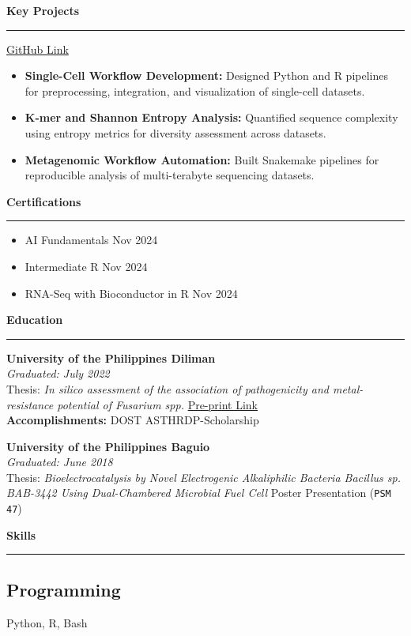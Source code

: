 \documentclass[a4paper,10pt]{article}
\newcommand{\sectiontitle}[1]{\vspace{10pt}\textbf{\Large #1}\vspace{5pt}\hrule\vspace{10pt}}
\begin{document}
	\sectiontitle{Key Projects} \dotfill \href{https://github.com/GABallena}{GitHub Link}
	\begin{itemize}[left=0pt]
		\item \textbf{Single-Cell Workflow Development:} Designed Python and R pipelines for preprocessing, integration, and visualization of single-cell datasets.
		\item \textbf{K-mer and Shannon Entropy Analysis:} Quantified sequence complexity using entropy metrics for diversity assessment across datasets.
		\item \textbf{Metagenomic Workflow Automation:} Built Snakemake pipelines for reproducible analysis of multi-terabyte sequencing datasets.
	\end{itemize}
	
	\sectiontitle{Certifications}
	\begin{itemize}[left=0pt]
		\item AI Fundamentals \dotfill Nov 2024
		\item Intermediate R \dotfill Nov 2024
		\item RNA-Seq with Bioconductor in R \dotfill Nov 2024
	\end{itemize}
	
	\sectiontitle{Education}
	
	\textbf{University of the Philippines Diliman} \\
	\textit{Graduated: July 2022} \\
	Thesis: \textit{In silico assessment of the association of pathogenicity and metal-resistance potential of \textit{Fusarium} spp.} \dotfill \href{https://www.biorxiv.org/content/10.1101/2022.10.12.511937v1}{Pre-print Link} \\
	\textbf{Accomplishments:} DOST ASTHRDP-Scholarship
	
	\textbf{University of the Philippines Baguio} \\
	\textit{Graduated: June 2018} \\
	Thesis: \textit{Bioelectrocatalysis by Novel Electrogenic Alkaliphilic Bacteria \textit{Bacillus} sp. BAB-3442 Using Dual-Chambered Microbial Fuel Cell} \dotfill Poster Presentation (\texttt{PSM 47})
	
	\sectiontitle{Skills}
	
	\subsection*{Programming}
	Python, R, Bash
	
\end{document}
